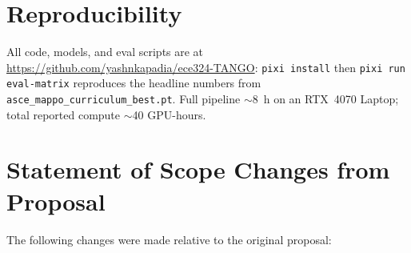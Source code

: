\documentclass{article}
\begin{document}
\section{Reproducibility}
\label{sec:reproducibility}

All code, models, and eval scripts are at \url{https://github.com/yashnkapadia/ece324-TANGO}: \texttt{pixi install} then \texttt{pixi run eval-matrix} reproduces the headline numbers from \texttt{asce\_mappo\_curriculum\_best.pt}. Full pipeline ${\sim}$8~h on an RTX~4070 Laptop; total reported compute ${\sim}$40 GPU-hours.




\section*{Statement of Scope Changes from Proposal}
\label{sec:scope}

The following changes were made relative to the original proposal:
\end{document}
